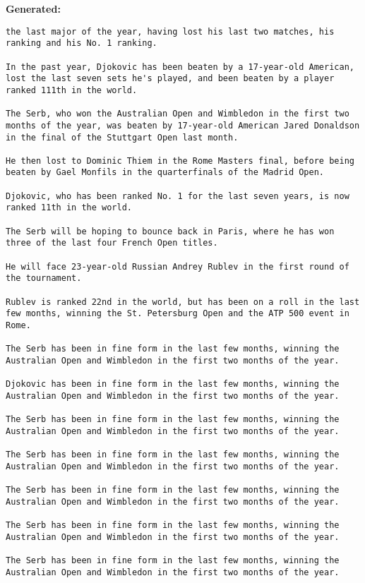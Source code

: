 {\bf\ttfamily Generated: }

\begin{lstlisting}
the last major of the year, having lost his last two matches, his ranking and his No. 1 ranking.

In the past year, Djokovic has been beaten by a 17-year-old American, lost the last seven sets he's played, and been beaten by a player ranked 111th in the world.

The Serb, who won the Australian Open and Wimbledon in the first two months of the year, was beaten by 17-year-old American Jared Donaldson in the final of the Stuttgart Open last month.

He then lost to Dominic Thiem in the Rome Masters final, before being beaten by Gael Monfils in the quarterfinals of the Madrid Open.

Djokovic, who has been ranked No. 1 for the last seven years, is now ranked 11th in the world.

The Serb will be hoping to bounce back in Paris, where he has won three of the last four French Open titles.

He will face 23-year-old Russian Andrey Rublev in the first round of the tournament.

Rublev is ranked 22nd in the world, but has been on a roll in the last few months, winning the St. Petersburg Open and the ATP 500 event in Rome.

The Serb has been in fine form in the last few months, winning the Australian Open and Wimbledon in the first two months of the year.

Djokovic has been in fine form in the last few months, winning the Australian Open and Wimbledon in the first two months of the year.

The Serb has been in fine form in the last few months, winning the Australian Open and Wimbledon in the first two months of the year.

The Serb has been in fine form in the last few months, winning the Australian Open and Wimbledon in the first two months of the year.

The Serb has been in fine form in the last few months, winning the Australian Open and Wimbledon in the first two months of the year.

The Serb has been in fine form in the last few months, winning the Australian Open and Wimbledon in the first two months of the year.

The Serb has been in fine form in the last few months, winning the Australian Open and Wimbledon in the first two months of the year.


\end{lstlisting}
